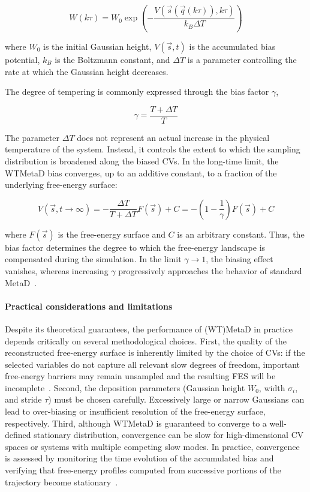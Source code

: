 \begin{equation}
W (k \tau ) = W_0 \exp \left( -\frac{V(\vec{s}(\vec{q}(k \tau)),k \tau)}{k_B\Delta T} \right )
\end{equation}

where $W_0$ is the initial Gaussian height, $V(\vec{s},t)$ is the accumulated bias potential, $k_B$ is the Boltzmann constant, and $\Delta T$ is a parameter controlling the rate at which the Gaussian height decreases.

The degree of tempering is commonly expressed through the bias factor $\gamma$,

\begin{equation}
\gamma
=
\frac{T+\Delta T}{T}
\end{equation}

The parameter $\Delta T$ does not represent an actual increase in the physical temperature of the system. Instead, it controls the extent to which the sampling distribution is broadened along the biased CVs. In the long-time limit, the WTMetaD bias converges, up to an additive constant, to a fraction of the underlying free-energy surface:

\begin{equation}
V(\vec{s},t\rightarrow \infty) = -\frac{\Delta T}{T+\Delta T}F(\vec{s}) + C = -\left(1 - \frac{1}{\gamma}\right)F(\vec{s}) + C
\end{equation}

where $F(\vec{s})$ is the free-energy surface and $C$ is an arbitrary constant. Thus, the bias factor determines the degree to which the free-energy landscape is compensated during the simulation. In the limit $\gamma\rightarrow1$, the biasing effect vanishes, whereas increasing $\gamma$ progressively approaches the behavior of standard MetaD~\cite{Barducci2008}.

\paragraph{Practical considerations and limitations}
Despite its theoretical guarantees, the performance of (WT)MetaD in practice depends critically on several methodological choices. First, the quality of the reconstructed free-energy surface is inherently limited by the choice of CVs: if the selected variables do not capture all relevant slow degrees of freedom, important free-energy barriers may remain unsampled and the resulting FES will be incomplete~\cite{Bussi2020}. Second, the deposition parameters (Gaussian height $W_0$, width $\sigma_i$, and stride $\tau$) must be chosen carefully. Excessively large or narrow Gaussians can lead to over-biasing or insufficient resolution of the free-energy surface, respectively. Third, although WTMetaD is guaranteed to converge to a well-defined stationary distribution, convergence can be slow for high-dimensional CV spaces or systems with multiple competing slow modes. In practice, convergence is assessed by monitoring the time evolution of the accumulated bias and verifying that free-energy profiles computed from successive portions of the trajectory become stationary~\cite{termo_metad_presion}.

